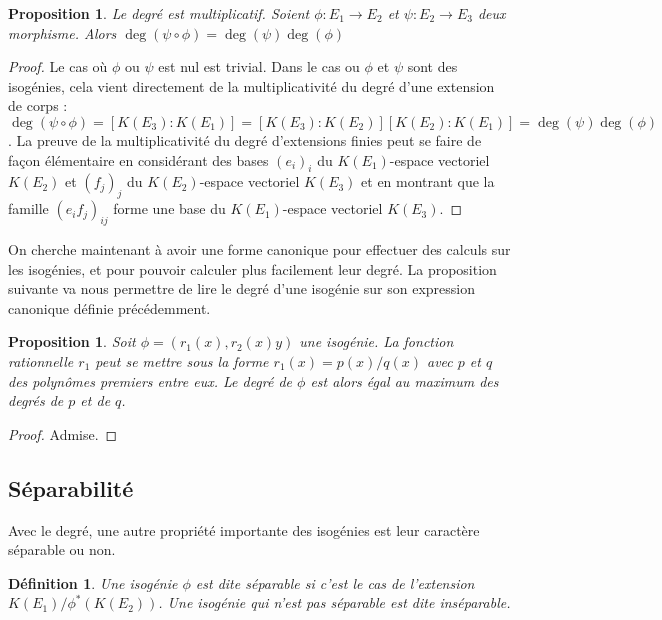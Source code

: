 \documentclass{article}
\theoremstyle{plain}%
\newtheorem{prop}[thm]{Proposition}
\newtheorem{deff}[thm]{Définition}
\theoremstyle{definition}%
\begin{document}
\begin{prop}
  Le degré est multiplicatif. Soient $\phi : E_1\to E_2$ et $\psi : E_2\to E_3$ deux morphisme. Alors $\deg(\psi \circ \phi) = \deg(\psi)\deg(\phi)$ 
\end{prop}

\begin{proof}
  Le cas où $\phi$ ou $\psi$ est nul est trivial. Dans le cas ou $\phi$ et $\psi$ sont des isogénies, cela vient directement de la multiplicativité du degré d'une extension de corps : $\deg(\psi \circ \phi) = [K(E_3) :K(E_1)] = [K(E_3):K(E_2)][K(E_2):K(E_1)] = \deg(\psi)\deg(\phi)$. La preuve de la multiplicativité du degré d'extensions finies peut se faire de façon élémentaire en considérant des bases $(e_i)_i$ du $K(E_1)$-espace vectoriel $K(E_2)$ et $(f_j)_j$ du $K(E_2)$-espace vectoriel $K(E_3)$ et en montrant que la famille $(e_if_j)_{ij}$ forme une base du $K(E_1)$-espace vectoriel $K(E_3)$.
\end{proof}

On cherche maintenant à avoir une forme canonique pour effectuer des calculs sur les isogénies, et pour pouvoir calculer plus facilement leur degré.
La proposition suivante va nous permettre de lire le degré d'une isogénie sur son expression canonique définie précédemment.

\begin{prop}
  \label{caracdeg}
  Soit $\phi = (r_1(x), r_2(x)y)$ une isogénie. La fonction rationnelle $r_1$ peut se mettre sous la forme $r_1(x) = p(x) / q(x)$ avec $p$ et $q$ des polynômes premiers entre eux. Le degré de $\phi$ est alors égal au maximum des degrés de $p$ et de $q$. 
\end{prop}

\begin{proof}
  Admise. 
\end{proof}

\subsection{Séparabilité}

Avec le degré, une autre propriété importante des isogénies est leur caractère séparable ou non.

\begin{deff}
  Une isogénie $\phi$ est dite séparable si c'est le cas de l'extension $K(E_1) / \phi^*(K(E_2))$. Une isogénie qui n'est pas séparable est dite inséparable.
\end{deff}
\end{document}
